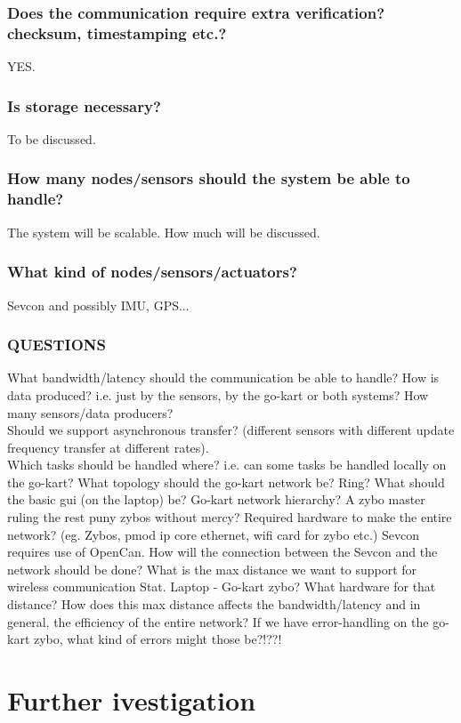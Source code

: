 \subsubsection{Does the communication require extra verification? checksum, timestamping etc.?}
YES.

\subsubsection{Is storage necessary?}
To be discussed.

\subsubsection{How many nodes/sensors should the system be able to handle?}
The system will be scalable. How much will be discussed.

\subsubsection{What kind of nodes/sensors/actuators?}
Sevcon and possibly IMU, GPS...

\subsubsection{QUESTIONS}
What bandwidth/latency should the communication be able to handle?
How is data produced? i.e. just by the sensors, by the go-kart or both systems?
How many sensors/data producers?\\
Should we support asynchronous transfer? (different sensors with different 
update frequency transfer at different rates).\\
Which tasks should be handled where? i.e. can some tasks be handled locally on 
the go-kart?
What topology should the go-kart network be? Ring?
What should the basic gui (on the laptop) be?
Go-kart network hierarchy? A zybo master ruling the rest puny zybos without mercy?
Required hardware to make the entire network? (eg. Zybos, pmod ip core ethernet, wifi card for zybo etc.)
Sevcon requires use of OpenCan. How will the connection between the Sevcon and the network should be done?
What is the max distance we want to support for wireless communication Stat. Laptop - Go-kart zybo? What hardware for that distance?
How does this max distance affects the bandwidth/latency and in general, the efficiency of the entire network?
If we have error-handling on the go-kart zybo, what kind of errors might those be?!??!


\section{Further ivestigation}
